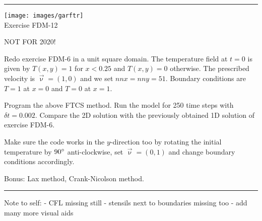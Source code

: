 \begin{center}
\begin{minipage}[t]{0.77\textwidth}
\par\noindent\rule{\textwidth}{0.4pt}

\begin{center}
\texttt{[image: images/garftr]} \\
{\color{orange}Exercise FDM-12}
\end{center}

NOT FOR 2020! 

Redo exercise FDM-6 in a unit square domain. 
The temperature field at $t=0$ is 
given by $T(x,y)=1$ for $x<0.25$ and $T(x,y)=0$ otherwise. The prescribed 
velocity is $\vec\upnu=(1,0)$ and we set $nnx=nny=51$.
Boundary conditions are $T=1$ at $x=0$ and $T=0$ at $x=1$.

Program the above FTCS method. Run the model for 250 time steps with $\delta t=0.002$. 
Compare the 2D solution with the previously obtained 1D solution of exercise FDM-6.

Make sure the code works in the $y$-direction too by rotating the initial temperature 
by $90\degree$ anti-clockwise, set $\vec{\upnu}=(0,1)$ and change boundary conditions accordingly. 

Bonus: Lax method, Crank-Nicolson method.

\par\noindent\rule{\textwidth}{0.4pt}
\end{minipage}
\end{center}

Note to self:
- CFL missing still
- stensils next to boundaries missing too
- add many more visual aids










